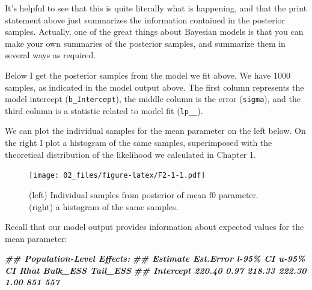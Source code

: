 \documentclass[
]{book}
\newenvironment{Shaded}{\begin{snugshade}}{\end{snugshade}}
\newcommand{\CommentTok}[1]{\textcolor[rgb]{0.56,0.35,0.01}{\textit{#1}}}
\newcommand{\DocumentationTok}[1]{\textcolor[rgb]{0.56,0.35,0.01}{\textbf{\textit{#1}}}}
\newcommand{\FunctionTok}[1]{\textcolor[rgb]{0.00,0.00,0.00}{#1}}
\newcommand{\NormalTok}[1]{#1}
\newcommand{\OtherTok}[1]{\textcolor[rgb]{0.56,0.35,0.01}{#1}}
\newcommand{\SpecialCharTok}[1]{\textcolor[rgb]{0.00,0.00,0.00}{#1}}
\begin{document}
It's helpful to see that this is quite literally what is happening, and that the print statement above just summarizes the information contained in the posterior samples. Actually, one of the great things about Bayesian models is that you can make your own summaries of the posterior samples, and summarize them in several ways as required.

Below I get the posterior samples from the model we fit above. We have 1000 samples, as indicated in the model output above. The first column represents the model intercept (\texttt{b\_Intercept}), the middle column is the error (\texttt{sigma}), and the third column is a statistic related to model fit (\texttt{lp\_\_}).

\begin{Shaded}
\end{Shaded}

We can plot the individual samples for the mean parameter on the left below. On the right I plot a histogram of the same samples, superimposed with the theoretical distribution of the likelihood we calculated in Chapter 1.

\begin{figure}
\centering
\texttt{[image: 02\_files/figure-latex/F2-1-1.pdf]}
\caption{\label{fig:F2-1}(left) Individual samples from posterior of mean f0 parameter. (right) a histogram of the same samples.}
\end{figure}

Recall that our model output provides information about expected values for the mean parameter:

\begin{Shaded}
\begin{Highlighting}[]
\DocumentationTok{\#\# Population{-}Level Effects: }
\DocumentationTok{\#\#           Estimate Est.Error l{-}95\% CI u{-}95\% CI Rhat Bulk\_ESS Tail\_ESS}
\DocumentationTok{\#\# Intercept   220.40      0.97   218.33   222.30 1.00      851      557}
\end{Highlighting}
\end{Shaded}
\end{document}
